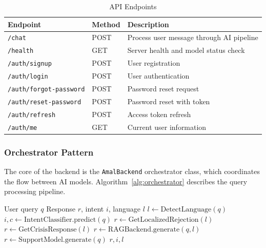 \begin{table}[h]
\centering
\caption{API Endpoints}
\label{tab:endpoints}
\begin{tabular}{@{}llp{6cm}@{}}
\toprule
Endpoint & Method & Description \\
\midrule
\texttt{/chat} & POST & Process user message through AI pipeline \\
\texttt{/health} & GET & Server health and model status check \\
\texttt{/auth/signup} & POST & User registration \\
\texttt{/auth/login} & POST & User authentication \\
\texttt{/auth/forgot-password} & POST & Password reset request \\
\texttt{/auth/reset-password} & POST & Password reset with token \\
\texttt{/auth/refresh} & POST & Access token refresh \\
\texttt{/auth/me} & GET & Current user information \\
\bottomrule
\end{tabular}
\end{table}

\subsubsection{Orchestrator Pattern}

The core of the backend is the \texttt{AmalBackend} orchestrator class, which coordinates the flow between AI models. Algorithm~\ref{alg:orchestrator} describes the query processing pipeline.

\begin{algorithm}[h]
\caption{Query Processing Pipeline}
\label{alg:orchestrator}
\begin{algorithmic}[1]
\REQUIRE User query $q$
\ENSURE Response $r$, intent $i$, language $l$
\STATE $l \leftarrow \text{DetectLanguage}(q)$
\STATE $i, c \leftarrow \text{IntentClassifier.predict}(q)$
    \STATE $r \leftarrow \text{GetLocalizedRejection}(l)$
    \STATE $r \leftarrow \text{GetCrisisResponse}(l)$ 
    \STATE $r \leftarrow \text{RAGBackend.generate}(q, l)$
    \STATE $r \leftarrow \text{SupportModel.generate}(q)$
\ENDIF
\RETURN $r, i, l$
\end{algorithmic}
\end{algorithm}


